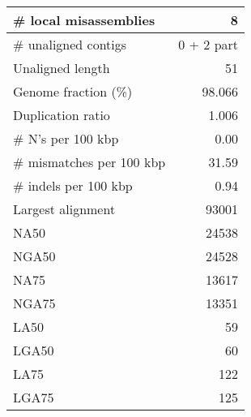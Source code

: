 \documentclass[12pt,a4paper]{article}
\begin{document}
\begin{table}[ht]
\begin{center}
\begin{tabular}{|l*{1}{|r}|}
\# local misassemblies & 8 \\ \hline
\# unaligned contigs & 0 + 2 part \\ \hline
Unaligned length & 51 \\ \hline
Genome fraction (\%) & 98.066 \\ \hline
Duplication ratio & 1.006 \\ \hline
\# N's per 100 kbp & 0.00 \\ \hline
\# mismatches per 100 kbp & 31.59 \\ \hline
\# indels per 100 kbp & 0.94 \\ \hline
Largest alignment & 93001 \\ \hline
NA50 & 24538 \\ \hline
NGA50 & 24528 \\ \hline
NA75 & 13617 \\ \hline
NGA75 & 13351 \\ \hline
LA50 & 59 \\ \hline
LGA50 & 60 \\ \hline
LA75 & 122 \\ \hline
LGA75 & 125 \\ \hline
\end{tabular}
\end{center}
\end{table}
\end{document}
